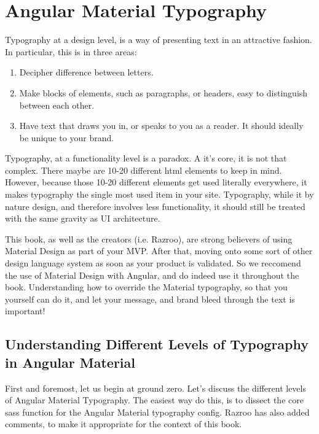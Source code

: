\chapter{ Angular Material Typography }

Typography at a design level, is a way of presenting text in an attractive 
fashion. In particular, this is in three areas: 
\begin{enumerate}
  \item Decipher difference between letters.
  \item Make blocks of elements, such as paragraphs, or headers, easy to 
  distinguish between each other. 
  \item Have text that draws you in, or speaks to you as a reader. It 
  should ideally be unique to your brand.
\end{enumerate}

Typography, at a functionality level is a paradox. A it's core, it is 
not that complex. There maybe are 10-20 different html elements to keep in
mind. However, because those 10-20 different elements get used literally 
everywhere, it makes typography the single most used item in your site. Typography,
while it by nature design, and therefore involves less functionality, it should 
still be treated with the same gravity as UI architecture. 

This book, as well as the creators (i.e. Razroo), are strong believers of 
using Material Design as part of your MVP. After that, moving onto some sort 
of other design language system as soon as your product is validated. So 
we reccomend the use of Material Design with Angular, and do indeed use it
throughout the book. Understanding how to override the Material typography,
so that you yourself can do it, and let your message, and brand bleed 
through the text is important!

\section{Understanding Different Levels of Typography in Angular Material}
First and foremost, let us begin at ground zero. Let's discuss the different 
levels of Angular Material Typography. The easiest way do this, is to dissect 
the core sass function for the Angular Material typography config. Razroo has 
also added comments, to make it appropriate for the context of this book.

